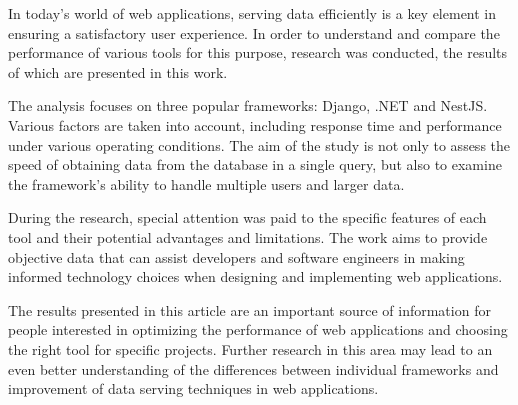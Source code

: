 In today's world of web applications, serving data efficiently is a key element in ensuring a satisfactory user experience.
In order to understand and compare the performance of various tools for this purpose, research was conducted, the results of which are presented in this work.

The analysis focuses on three popular frameworks: Django, .NET and NestJS.
Various factors are taken into account, including response time and performance under various operating conditions.
The aim of the study is not only to assess the speed of obtaining data from the database in a single query, but also to examine the framework's ability to handle multiple users and larger data.

During the research, special attention was paid to the specific features of each tool and their potential advantages and limitations. The work aims to provide objective data that can assist developers and software engineers in making informed technology choices when designing and implementing web applications.

The results presented in this article are an important source of information for people interested in optimizing the performance of web applications and choosing the right tool for specific projects.
Further research in this area may lead to an even better understanding of the differences between individual frameworks and improvement of data serving techniques in web applications.